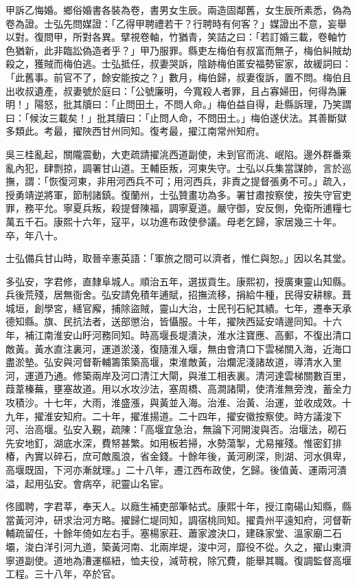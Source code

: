 \begin{pinyinscope}
甲訴乙悔婚。鄉俗婚書各裝為卷，書男女生辰。兩造固鄰舊，女生辰所素悉，偽為卷為證。士弘先問媒證：「乙得甲聘禮若干？行聘時有何客？」媒證出不意，妄舉以對。復問甲，所對各異。擘視卷軸，竹猶青，笑詰之曰：「若訂婚三載，卷軸竹色猶新，此非臨訟偽造者乎？」甲乃服罪。縣吏左梅伯有叔富而無子，梅伯糾賊劫殺之，獲賊而梅伯逃。士弘抵任，叔妻哭訴，陰跡梅伯匿安福勢宦家，故緩詞曰：「此舊事。前官不了，餘安能按之？」數月，梅伯歸，叔妻復訴，置不問。梅伯且出收叔遺產，叔妻號於庭曰：「公號廉明，今寬殺人者罪，且占寡婦田，何得為廉明！」陽怒，批其牘曰：「止問田土，不問人命。」梅伯益自得，赴縣訴理，乃笑謂曰：「候汝三載矣！」批其牘曰：「止問人命，不問田土。」梅伯遂伏法。其善斷獄多類此。考最，擢陜西甘州同知。復考最，擢江南常州知府。

吳三桂亂起，關隴震動，大吏疏請擢洮西道副使，未到官而洮、岷陷。邊外群番乘亂內犯，肆剽掠，調署甘山道。王輔臣叛，河東失守。士弘以兵集當謀帥，言於巡撫，謂：「恢復河東，非用河西兵不可；用河西兵，非責之提督張勇不可。」疏入，授勇靖逆將軍，節制諸鎮。復蘭州，士弘贊畫功為多。署甘肅按察使，按失守官吏罪，務平允。寧夏兵叛，殺提督陳福，調寧夏道。嚴守御，安反側，免衛所逋糧七萬五千石。康熙十六年，寇平，以功進布政使參議。母老乞歸，家居幾三十年。卒，年八十。

士弘備兵甘山時，取晉辛憲英語：「軍旅之間可以濟者，惟仁與恕。」因以名其堂。

多弘安，字君修，直隸阜城人。順治五年，選拔貢生。康熙初，授廣東靈山知縣。兵後荒殘，居無衙舍。弘安請免積年逋賦，招撫流移，捐給牛種，民得安耕稼。葺城垣，創學宮，繕官廨，捕除盜賊，靈山大治，士民刊石紀其績。七年，遷奉天承德知縣。旗、民抗法者，送部懲治，皆懾服。十年，擢陜西延安靖邊同知。十六年，補江南淮安山盱河務同知。時高堰長堤潰決，淮水注寶應、高郵，不復出清口敵黃。黃水直注裏河，運道淤淺，復隨淮入堰，無由會清口下雲梯關入海，近海口盡淤墊。弘安與河督靳輔籌策築高堰，束淮敵黃，治爛泥淺諸故道，導清水入里河，運道乃通。修築兩岸及河口清江大閘，與淮工相表裏。清河達雲梯關數百里，葭葦榛蕪，壅塞故道。用以水攻沙法，塞周橋、高澗諸閘，使清淮無旁洩，蓄全力攻積沙。十七年，大雨，淮盛漲，與黃並入海。治淮、治黃、治運，並收成效。十九年，擢淮安知府。二十年，擢淮揚道。二十四年，擢安徽按察使。時方議浚下河、治高堰。弘安入覲，疏陳：「高堰宜急治，無論下河開浚與否。治堰法，砌石先安地釘，湖底水深，費帑甚繁。如用板若掃，水勢蕩掣，尤易摧殘。惟密釘排椿，內實以碎石，庶可敵風浪，省金錢。十餘年後，黃河刷深，則湖、河水俱卑，高堰既固，下河亦漸就理。」二十八年，遷江西布政使，乞歸。後值黃、運兩河潰溢，起用弘安。會病卒，祀靈山名宦。

佟國聘，字君莘，奉天人。以廕生補吏部筆帖式。康熙十年，授江南碭山知縣，縣當黃河沖，研求治河方略。擢歸仁堤同知，調宿桃同知。擢貴州平遠知府，河督靳輔疏留任，十餘年倚如左右手。塞楊家莊、蕭家渡決口，建硃家堂、溫家廟二石壩，浚白洋引河九道，築黃河南、北兩岸堤，浚中河，靡役不從。久之，擢山東濟寧道副使。道地為漕運樞紐，恤夫役，減苛稅，除冗費，能舉其職。復調監督高堰工程。三十八年，卒於官。


\end{pinyinscope}
